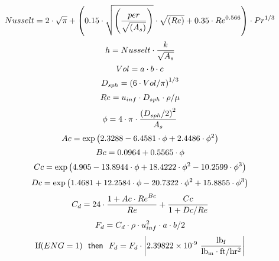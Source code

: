 \documentclass[10pt,fleqn]{article}
\newcommand{\KS}[1]{\mbox{\sf\ \ #1\ \ \mit}}
\newcommand{\V}[1]{\mbox{$ #1 $}}
\newcommand{\I}{\mbox{\hspace{0.20in}}}
\begin{document}
\begin{equation}
\I \label{EES Eqn:133}
\V{Nusselt} =2\cdot \sqrt{  \pi  }+ \left( 0.15\cdot \sqrt{ \left( \frac {\V{per}}{ \sqrt{ \left( A_{s} \right) } } \right) }\cdot \sqrt{ \left( \V{Re}  \right) }+0.35\cdot \V{Re} ^{0.566} \right) \cdot \V{Pr} ^{1/3} 
\end{equation}
\begin{equation}
\I \label{EES Eqn:134}
h=\V{Nusselt} \cdot \frac {k}{ \sqrt{  A_{s}  } } 
\end{equation}
\begin{equation}
\I \label{EES Eqn:135}
\V{Vol} =a\cdot b\cdot c 
\end{equation}
\begin{equation}
\I \label{EES Eqn:136}
D_{sph}= \left( 6\cdot \V{Vol}/\pi \right) ^{1/3} 
\end{equation}
\begin{equation}
\I \label{EES Eqn:137}
\V{Re} =u_{inf}\cdot D_{sph}\cdot \rho/\mu 
\end{equation}
\begin{equation}
\I \label{EES Eqn:138}
\phi=4\cdot \pi\cdot \frac { \left( D_{sph}/2 \right) ^{2}}{ A_{s} } 
\end{equation}
\begin{equation}
\I \label{EES Eqn:139}
\V{Ac} =\exp{ \left( 2.3288-6.4581\cdot \phi+2.4486\cdot \phi^{2} \right) } 
\end{equation}
\begin{equation}
\I \label{EES Eqn:140}
\V{Bc} =0.0964+0.5565\cdot \phi 
\end{equation}
\begin{equation}
\I \label{EES Eqn:141}
\V{Cc} =\exp{ \left( 4.905-13.8944\cdot \phi+18.4222\cdot \phi^{2}-10.2599\cdot \phi^{3} \right) } 
\end{equation}
\begin{equation}
\I \label{EES Eqn:142}
\V{Dc} =\exp{ \left( 1.4681+12.2584\cdot \phi-20.7322\cdot \phi^{2}+15.8855\cdot \phi^{3} \right) } 
\end{equation}
\begin{equation}
\I \label{EES Eqn:143}
C_{d}=24\cdot \frac {1+\V{Ac} \cdot \V{Re} ^{Bc}}{ \V{Re} }+\frac {\V{Cc}}{ 1+\V{Dc}/\V{Re}} 
\end{equation}
\begin{equation}
\I \label{EES Eqn:144}
F_{d}=C_{d}\cdot \rho\cdot u_{inf}^{2}\cdot a\cdot b/2 
\end{equation}
\begin{equation}
\I \label{EES Eqn:145}
\mbox{If}{ \left( \V{ENG} =1 \right) } \KS{then}  F_{d}=F_{d}\cdot \rm { \left|2.39822\times 10^{ \cdot 9}\ \frac {\rm{lb_{f}}}{\rm{lb_{m} \cdot ft/hr^{2}}}\right|} 
\end{equation}
\end{document}
